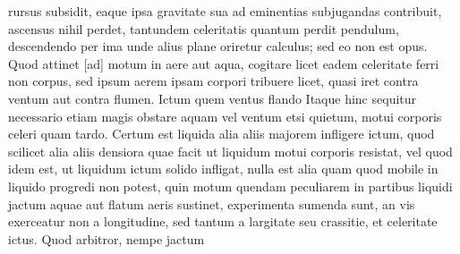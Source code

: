 rursus subsidit, eaque ipsa gravitate sua ad eminentias subjugandas contribuit, ascensus nihil perdet,
tantundem celeritatis quantum perdit pendulum\protect{}, descendendo per ima
unde alius plane oriretur calculus; sed eo non est opus.
\pend
\count{}
\pstart
Quod attinet [ad]
motum in aere\protect{} aut aqua\protect{}, cogitare licet eadem celeritate ferri non 
corpus, sed ipsum aerem
ipsam 
corpori tribuere licet, quasi iret contra ventum aut contra flumen. Ictum 
quem ventus flando 
Itaque hinc sequitur necessario etiam magis obstare aquam\protect{} vel ventum\protect{} etsi quietum, motui corporis celeri quam tardo.
\pend
\pstart
Certum est liquida alia aliis majorem infligere ictum\protect{}, quod scilicet alia aliis densiora
quae facit ut liquidum motui corporis resistat, vel quod idem est, ut liquidum ictum solido infligat, nulla est alia quam quod mobile in liquido progredi non potest, quin motum quendam peculiarem in partibus liquidi 
jactum aquae aut flatum aeris\protect{} sustinet, experimenta sumenda sunt, an vis\protect{} exerceatur non a longitudine, sed tantum a largitate seu crassitie, et celeritate ictus. Quod arbitror, nempe jactum 

